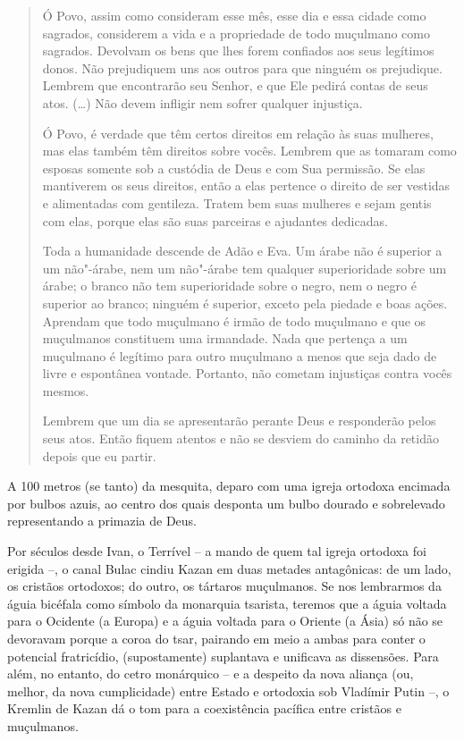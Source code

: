 \begin{quote}
Ó Povo, assim como consideram esse mês, esse dia e essa cidade como
sagrados, considerem a vida e a propriedade de todo muçulmano como
sagrados. Devolvam os bens que lhes forem confiados aos seus legítimos
donos. Não prejudiquem uns aos outros para que ninguém os prejudique.
Lembrem que encontrarão seu Senhor, e que Ele pedirá contas de seus
atos. (\ldots{}) Não devem infligir nem sofrer qualquer injustiça.

Ó Povo, é verdade que têm certos direitos em relação às suas mulheres,
mas elas também têm direitos sobre vocês. Lembrem que as tomaram como
esposas somente sob a custódia de Deus e com Sua permissão. Se elas
mantiverem os seus direitos, então a elas pertence o direito de ser
vestidas e alimentadas com gentileza. Tratem bem suas mulheres e sejam
gentis com elas, porque elas são suas parceiras e ajudantes dedicadas.

Toda a humanidade descende de Adão e Eva. Um árabe não é superior a um
não"-árabe, nem um não"-árabe tem qualquer superioridade sobre um árabe; o
branco não tem superioridade sobre o negro, nem o negro é superior ao
branco; ninguém é superior, exceto pela piedade e boas ações. Aprendam
que todo muçulmano é irmão de todo muçulmano e que os muçulmanos
constituem uma irmandade. Nada que pertença a um muçulmano é legítimo
para outro muçulmano a menos que seja dado de livre e espontânea
vontade. Portanto, não cometam injustiças contra vocês mesmos.

Lembrem que um dia se apresentarão perante Deus e responderão pelos seus
atos. Então fiquem atentos e não se desviem do caminho da retidão depois
que eu partir.
\end{quote}

A 100 metros (se tanto) da mesquita, deparo com uma igreja ortodoxa
encimada por bulbos azuis, ao centro dos quais desponta um bulbo dourado
e sobrelevado representando a primazia de Deus.

Por séculos desde Ivan, o Terrível -- a mando de quem tal igreja
ortodoxa foi erigida --, o canal Bulac cindiu Kazan em duas metades
antagônicas: de um lado, os cristãos ortodoxos; do outro, os tártaros
muçulmanos. Se nos lembrarmos da águia bicéfala como símbolo da
monarquia tsarista, teremos que a águia voltada para o Ocidente (a
Europa) e a águia voltada para o Oriente (a Ásia) só não se devoravam
porque a coroa do tsar, pairando em meio a ambas para conter o potencial
fratricídio, (supostamente) suplantava e unificava as dissensões. Para
além, no entanto, do cetro monárquico -- e a despeito da nova aliança
(ou, melhor, da nova cumplicidade) entre Estado e ortodoxia sob Vladímir
Putin --, o Kremlin de Kazan dá o tom para a coexistência pacífica entre
cristãos e muçulmanos.


